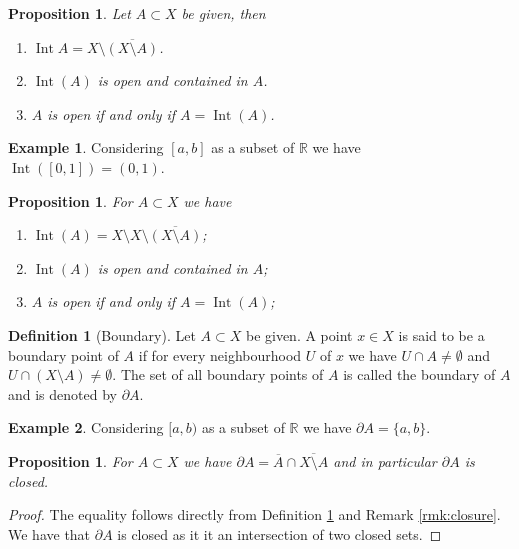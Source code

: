 \documentclass[11pt,a4paper]{article}
\theoremstyle{definition}
\newtheorem{definition}{Definition}[section]
\newtheorem{example}{Example}[section]
\theoremstyle{plain}
\newtheorem{proposition}[theorem]{Proposition}
\DeclareMathOperator{\Int}{Int}
\newcommand{\R}{\mathbb{R}}
\begin{document}
  \begin{proposition}
    Let $A \subset X$ be given, then
    \begin{enumerate}
      \item $\Int{A} = X \setminus \overline{(X \setminus A)}$.
      \item $\Int(A)$ is open and contained in $A$.
      \item $A$ is open if and only if $A = \Int(A)$.
    \end{enumerate}
  \end{proposition}

  \begin{example}
    Considering $[a,b]$ as a subset of $\R$ we have $\Int([0,1]) = (0,1)$.
  \end{example}
  
  \begin{proposition}
    For $A \subset X$ we have
    \begin{enumerate}
      \item[(1)] $\Int(A) = X \setminus X \setminus \overline{(X \setminus A)}$;
      \item[(2)] $\Int(A)$ is open and contained in $A$;
      \item[(3)] $A$ is open if and only if $A = \Int(A)$;
    \end{enumerate}
  \end{proposition}

  \begin{definition}[Boundary]\label{dfn:boundary}
    Let $A \subset X$ be given. A point $x \in X$ is said to be a boundary
    point of $A$ if for every neighbourhood $U$ of $x$ we have 
    $U \cap A \neq \emptyset$ and $U \cap (X \setminus A) \neq \emptyset$.
    The set of all boundary points of $A$ is called the boundary of $A$ and 
    is denoted by $\partial A$.
  \end{definition}

  \begin{example}
    Considering $[a,b)$ as a subset of $\R$ we have $\partial A = \{a,b\}$.
  \end{example}

  \begin{proposition}
    For $A \subset X$ we have 
    $\partial A = \overline{A} \cap \overline{X \setminus A}$ and in 
    particular $\partial A$ is closed.
  \end{proposition}
  \begin{proof}
    The equality follows directly from Definition \ref{dfn:boundary} and
    Remark \ref{rmk:closure}. We have that $\partial A$ is closed as it
    it an intersection of two closed sets.
  \end{proof}
\end{document}
